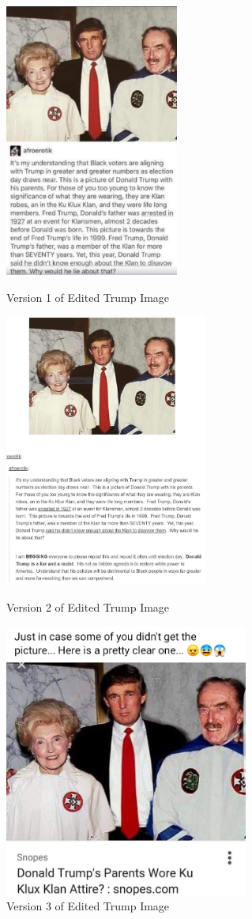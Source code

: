 \documentclass[12pt]{article}
\begin{document}
 \begin{figure}[h]
  \includegraphics[width=\linewidth,height = 9cm]{trumpkkk1.jpg}
  \caption{Version 1 of Edited Trump Image}\label{fig:TrumpKKK1}
\endminipage\hfill
{}
  \includegraphics[width=\linewidth,height = 9cm]{trumpkkk2.jpg}
  \caption{Version 2 of Edited Trump Image}\label{fig:TrumpKKK2}
\endminipage\hfill
{}%
  \includegraphics[width=\linewidth,height = 9cm]{trumpkkk3.jpg}
  \caption{Version 3 of Edited Trump Image}\label{fig:TrumpKKK3}
\endminipage
\end{figure}
\end{document}
